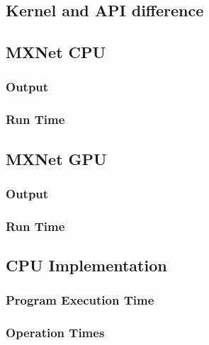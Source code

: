 \documentclass[10pt, letter]{article}
\begin{document}
\subsection{Kernel and API difference}

\subsection{MXNet CPU}

\subsubsection{Output}

\subsubsection{Run Time}

\subsection{MXNet GPU}

\subsubsection{Output}

\subsubsection{Run Time}

\subsection{CPU Implementation}

\subsubsection{Program Execution Time}

\subsubsection{Operation Times}
\end{document}
